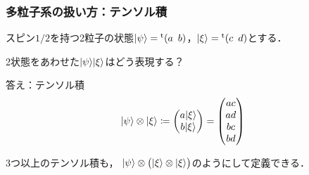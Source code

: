 \documentclass[
    10pt,
    ]{sotsu-beamer}
\begin{document}
\begin{frame}
    \frametitle{多粒子系の扱い方：テンソル積}

    スピン$1/2$を持つ2粒子の状態$\ket{\psi} = \cvector{a ; b}$，$\ket{\xi} = \cvector{c ; d}$とする．

    2状態をあわせた$\ket{\psi}\ket{\xi}$はどう表現する？

    \pause

    答え：\alert{テンソル積}
    \begin{equation}
        \ket{\psi} \otimes \ket{\xi}
            \coloneq \begin{pmatrix}
                a \ket{\xi}  \\  b \ket{\xi}
            \end{pmatrix}
            = \begin{pmatrix}
                ac \\ ad \\ bc \\ bd
            \end{pmatrix}
    \end{equation}

    \pause

    3つ以上のテンソル積も，
    $\ket{\psi} \otimes \bigl( \ket{\xi} \otimes \ket{\xi} \bigr)$のようにして定義できる．

\end{frame}
\end{document}
